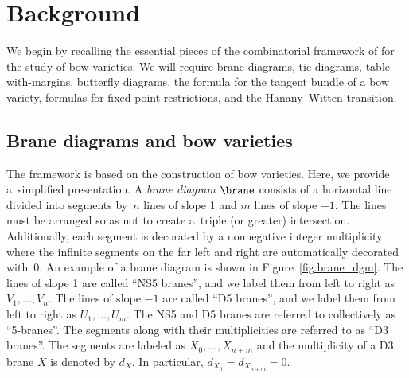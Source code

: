\section{Background} \label{sec:background}
We begin by recalling the essential pieces of the combinatorial framework of \cite{RS} for the study of bow varieties. We will require brane diagrams, tie diagrams, table-with-margins, butterfly diagrams, the formula for the tangent bundle of a bow variety, formulas for fixed point restrictions, and the Hanany--Witten transition.

\subsection{Brane diagrams and bow varieties}
The \cite{RS} framework is based on the \cite{NT} construction of bow varieties. Here, we provide a~simplified presentation. A \textit{brane diagram} $\brane$ consists of a horizontal line divided into segments by~$n$ lines of slope 1 and $m$ lines of slope $-1$. The lines must be arranged so as not to create a~triple (or greater) intersection. Additionally, each segment is decorated by a nonnegative integer multiplicity where the infinite segments on the far left and right are automatically decorated with~0. An example of a brane diagram is shown in Figure~\ref{fig:brane_dgm}. The lines of slope 1 are called ``NS5 branes'', and we label them from left to right as $V_1, \dots , V_n$. The lines of slope $-1$ are called ``D5 branes'', and we label them from left to right as $U_1, \dots , U_m$. The NS5 and D5 branes are referred to collectively as ``5-branes''. The segments along with their multiplicities are referred to as ``D3 branes''. The segments are labeled as $X_0, \dots , X_{n + m}$ and the multiplicity of a D3 brane $X$ is denoted by $d_X$. In particular, $d_{X_0} = d_{X_{n + m}} = 0$.

